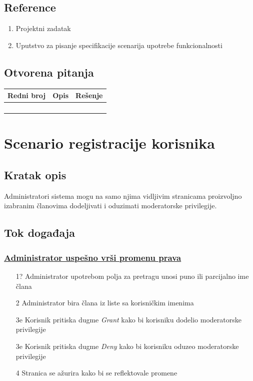 \documentclass[11pt,a4paper]{article}
\begin{document}
\subsection{Reference}
\begin{enumerate}
    \item Projektni zadatak
    \item Uputstvo za pisanje specifikacije scenarija upotrebe funkcionalnosti
\end{enumerate}
\subsection{Otvorena pitanja}
\begin{center}
\begin{tabular}{| >{\centering\arraybackslash}m{1.9cm} | >{\centering\arraybackslash}m{4.9cm} | >{\centering\arraybackslash}m{4.9cm} |}
\hline
\rowcolor[HTML]{000000} 
{\color[HTML]{FFFFFF} Redni broj } & {\color[HTML]{FFFFFF} Opis } & {\color[HTML]{FFFFFF} Rešenje } \\ \hline
 &  &  \\ \hline
 &  &  \\ \hline
 &  &  \\ \hline
 &  &  \\ \hline
\end{tabular}
\end{center}

\newpage

\section{Scenario registracije korisnika}
\subsection{Kratak opis}
Administratori sistema mogu na samo njima vidljivim stranicama proizvoljno izabranim članovima dodeljivati i oduzimati moderatorske privilegije.
\subsection{Tok događaja}
\subsubsection{\underline{Administrator uspešno vrši promenu prava}}
\begin{enumerate}
	\item[1?] Administrator upotrebom polja za pretragu unosi puno ili parcijalno ime člana
    \item[2 ] Administrator bira člana iz liste sa korisničkim imenima
    \item[3e] Korisnik pritiska dugme \textit{Grant} kako bi korisniku dodelio moderatorske privilegije
    \item[3e] Korisnik pritiska dugme \textit{Deny} kako bi korisniku oduzeo moderatorske privilegije
    \item[4 ] Stranica se ažurira kako bi se reflektovale promene
\end{enumerate}
\end{document}
